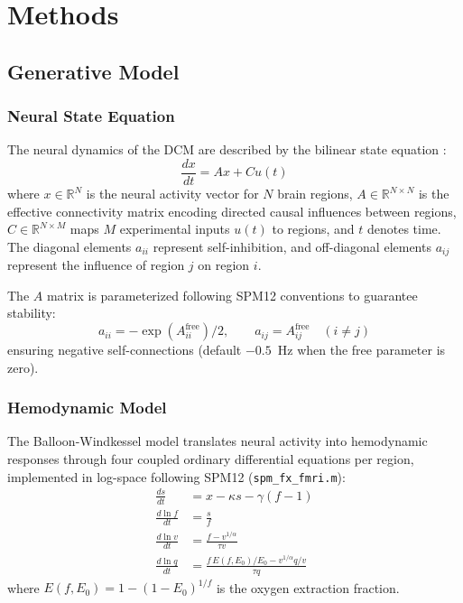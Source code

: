 
\section{Methods}

\subsection{Generative Model}

\subsubsection{Neural State Equation}

The neural dynamics of the DCM are described by the bilinear state
equation \citep{friston2003}:
\begin{equation}
  \frac{dx}{dt} = Ax + Cu(t)
  \label{eq:neural-state}
\end{equation}
where $x \in \mathbb{R}^N$ is the neural activity vector for $N$ brain
regions, $A \in \mathbb{R}^{N \times N}$ is the effective connectivity
matrix encoding directed causal influences between regions, $C \in
\mathbb{R}^{N \times M}$ maps $M$ experimental inputs $u(t)$ to regions,
and $t$ denotes time. The diagonal elements $a_{ii}$ represent
self-inhibition, and off-diagonal elements $a_{ij}$ represent the
influence of region $j$ on region $i$.

The $A$ matrix is parameterized following SPM12 conventions to guarantee
stability:
\begin{equation}
  a_{ii} = -\exp(A^\text{free}_{ii}) / 2, \qquad
  a_{ij} = A^\text{free}_{ij} \quad (i \neq j)
  \label{eq:a-param}
\end{equation}
ensuring negative self-connections (default $-0.5$~Hz when the free
parameter is zero).

\subsubsection{Hemodynamic Model}

The Balloon-Windkessel model \citep{stephan2007} translates neural
activity into hemodynamic responses through four coupled ordinary
differential equations per region, implemented in log-space following
SPM12 (\texttt{spm\_fx\_fmri.m}):
\begin{align}
  \frac{ds}{dt} &= x - \kappa s - \gamma (f - 1)
    \label{eq:vasodilatory} \\
  \frac{d \ln f}{dt} &= \frac{s}{f}
    \label{eq:flow} \\
  \frac{d \ln v}{dt} &= \frac{f - v^{1/\alpha}}{\tau v}
    \label{eq:volume} \\
  \frac{d \ln q}{dt} &= \frac{f\, E(f, E_0) / E_0 - v^{1/\alpha} q / v}{\tau q}
    \label{eq:deoxyhemoglobin}
\end{align}
where $E(f, E_0) = 1 - (1 - E_0)^{1/f}$ is the oxygen extraction
fraction.

